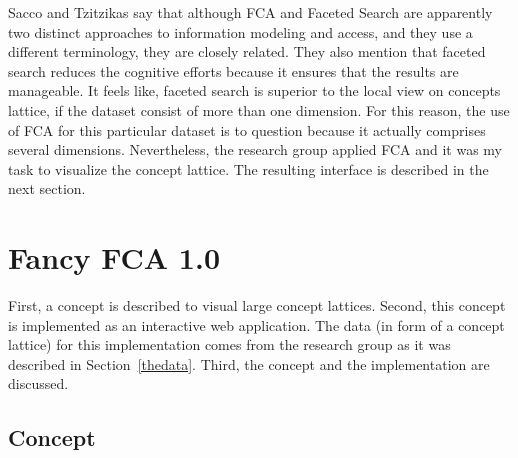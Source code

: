 \documentclass[11pt]{report}
\begin{document}
Sacco and Tzitzikas \cite{Sacco2009} say that although FCA and Faceted Search are apparently two distinct approaches to information modeling and access, and they use a different terminology, they are closely related. They also mention that faceted search reduces the cognitive efforts because it ensures that the results are manageable. It feels like, faceted search is superior to the local view on concepts lattice, if the dataset consist of more than one dimension. For this reason, the use of FCA for this particular dataset is to question because it actually comprises several dimensions. Nevertheless, the research group applied FCA and it was my task to visualize the concept lattice. The resulting interface is described in the next section.
\chapter{Fancy FCA 1.0}
\label{Fancy 1.0}

First, a concept is described to visual large concept lattices. Second, this concept is implemented as an interactive web application. The data (in form of a concept lattice) for this implementation comes from the research group as it was described in Section~\ref{thedata}. Third, the concept and the implementation are discussed.

\section{Concept}
\end{document}
